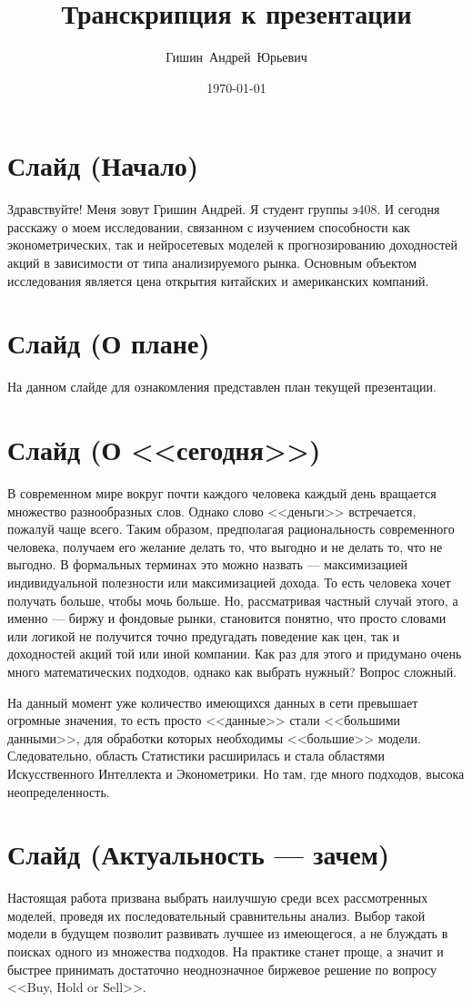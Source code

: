 \documentclass[a4paper, 12pt]{article}
\title{Транскрипция к презентации}
\author{Гишин~Андрей~Юрьевич}
\date{\today}
\begin{document}
	\maketitle
	\section{Слайд (Начало)}
		Здравствуйте! Меня зовут Гришин Андрей. Я студент группы э408. И сегодня расскажу о моем исследовании, связанном с изучением способности как эконометрических, так и нейросетевых моделей к прогнозированию доходностей акций в зависимости от типа анализируемого рынка. Основным объектом исследования является цена открытия китайских и американских компаний.
	\section{Слайд (О плане)}
		На данном слайде для ознакомления представлен план текущей презентации.
	\section{Слайд (О <<сегодня>>)}
		 В современном мире вокруг почти каждого человека каждый день вращается множество разнообразных слов. Однако слово <<деньги>> встречается, пожалуй чаще всего. Таким образом, предполагая рациональность современного человека, получаем его желание делать то, что выгодно и не делать то, что не выгодно. В формальных терминах это можно назвать --- максимизацией индивидуальной полезности или максимизацией дохода. То есть человека хочет получать больше, чтобы мочь больше. Но, рассматривая частный случай этого, а именно --- биржу и фондовые рынки, становится понятно, что просто словами или логикой не получится точно предугадать поведение как цен, так и доходностей акций той или иной компании. Как раз для этого и придумано очень много математических подходов, однако как выбрать нужный? Вопрос сложный.
		 
		 На данный момент уже количество имеющихся данных в сети превышает огромные значения, то есть просто <<данные>> стали <<большими данными>>, для обработки которых необходимы <<большие>> модели. Следовательно, область Статистики расширилась и стала областями Искусственного Интеллекта и Эконометрики. Но там, где много подходов, высока неопределенность. 
	\section{Слайд (Актуальность --- зачем)}
		Настоящая работа призвана выбрать наилучшую среди всех рассмотренных моделей, проведя их последовательный сравнительны анализ. Выбор такой модели в будущем позволит развивать лучшее из имеющегося, а не блуждать в поисках одного из множества подходов. На практике станет проще, а значит и быстрее принимать достаточно неоднозначное биржевое решение по вопросу <<Buy, Hold or Sell>>. 
\end{document}
